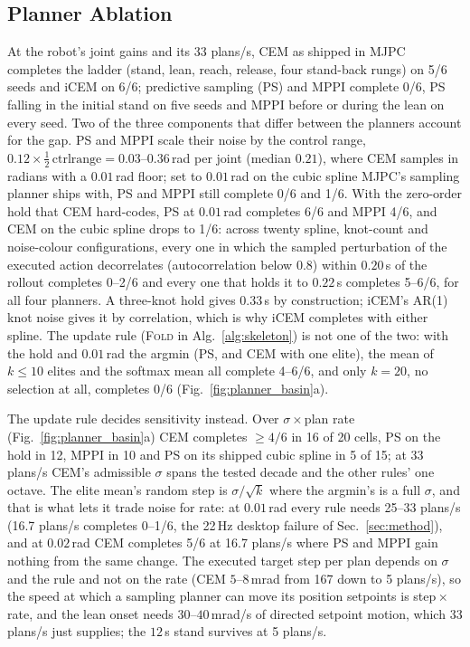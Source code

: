 \subsection{Planner Ablation}\label{sec:planner_ablation}
At the robot's joint gains and its 33 plans/s, CEM as shipped in MJPC completes
the ladder (stand, lean, reach, release, four stand-back rungs) on 5/6 seeds
and iCEM on 6/6; predictive sampling (PS) and MPPI complete 0/6, PS falling in
the initial stand on five seeds and MPPI before or during the lean on every
seed. Two of the three components that differ between the planners account for
the gap. PS and MPPI scale their noise by the control range,
$0.12\times\tfrac12\,\mathrm{ctrlrange}=0.03$--$0.36$\,rad per joint (median
$0.21$), where CEM samples in radians with a $0.01$\,rad floor; set to
$0.01$\,rad on the cubic spline MJPC's sampling planner ships with, PS and MPPI
still complete 0/6 and 1/6. With the zero-order hold that CEM hard-codes, PS at
$0.01$\,rad completes 6/6 and MPPI 4/6, and CEM on the cubic spline drops to
1/6: across twenty spline, knot-count and noise-colour configurations, every
one in which the sampled perturbation of the executed action decorrelates
(autocorrelation below $0.8$) within $0.20$\,s of the rollout completes 0--2/6
and every one that holds it to $0.22$\,s completes 5--6/6, for all four
planners. A three-knot hold gives $0.33$\,s by construction; iCEM's AR(1) knot
noise gives it by correlation, which is why iCEM completes with either spline.
The update rule (\textsc{Fold} in Alg.~\ref{alg:skeleton}) is not one of the
two: with the hold and $0.01$\,rad the argmin (PS, and CEM with one elite), the
mean of $k\le 10$ elites and the softmax mean all complete 4--6/6, and only
$k=20$, no selection at all, completes 0/6 (Fig.~\ref{fig:planner_basin}a).

The update rule decides sensitivity instead. Over $\sigma\times$plan rate
(Fig.~\ref{fig:planner_basin}a) CEM completes $\ge 4/6$ in 16 of 20 cells, PS
on the hold in 12, MPPI in 10 and PS on its shipped cubic spline in 5 of 15; at
33 plans/s CEM's admissible $\sigma$ spans the tested decade and the other
rules' one octave. The elite mean's random step is $\sigma/\sqrt{k}$ where the
argmin's is a full $\sigma$, and that is what lets it trade noise for rate: at
$0.01$\,rad every rule needs 25--33 plans/s (16.7 plans/s completes 0--1/6, the
22\,Hz desktop failure of Sec.~\ref{sec:method}), and at $0.02$\,rad CEM
completes 5/6 at 16.7 plans/s where PS and MPPI gain nothing from the same
change. The executed target step per plan depends on $\sigma$ and the rule and
not on the rate (CEM $5$--$8$\,mrad from 167 down to 5 plans/s), so the speed
at which a sampling planner can move its position setpoints is
step\,$\times$\,rate, and the lean onset needs $30$--$40$\,mrad/s of directed
setpoint motion, which 33 plans/s just supplies; the $12$\,s stand survives at
5 plans/s.

